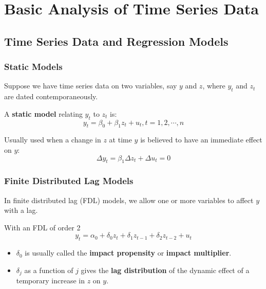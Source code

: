 \documentclass[11pt,a4paper]{article}
\begin{document}
\section{Basic Analysis of Time Series Data}
\subsection{Time Series Data and Regression Models}
\subsubsection{Static Models}
Suppose we have time series data on two variables, say $y$ and $z$, where $y_t$ and $z_t$ are dated contemporaneously. \par
A \textbf{static model} relating $y_t$ to $z_t$ is:
\[
y_t = \beta_0 + \beta_1 z_t + u_t, t = 1, 2, \cdots, n
\]

Usually used when a change in $z$ at time $y$ is believed to have an immediate effect on $y$:
\[
\Delta y_t = \beta_1 \Delta z_t + \Delta u_t = 0
\]

\subsubsection{Finite Distributed Lag Models}
In finite distributed lag (FDL) models, we allow one or more variables to affect $y$ with a lag. \par
With an FDL of order 2
\[
y_t = \alpha_0 + \delta_0 z_t + \delta_1 z_{t-1} + \delta_2 z_{t-2} + u_t
\]

\begin{itemize}
    \item $\delta_0$ is usually called the \textbf{impact propensity} or \textbf{impact multiplier}.
    \item $\delta_j$ as a function of $j$ gives the \textbf{lag distribution} of the dynamic effect of a temporary increase in $z$ on $y$.
\end{itemize}
\end{document}
